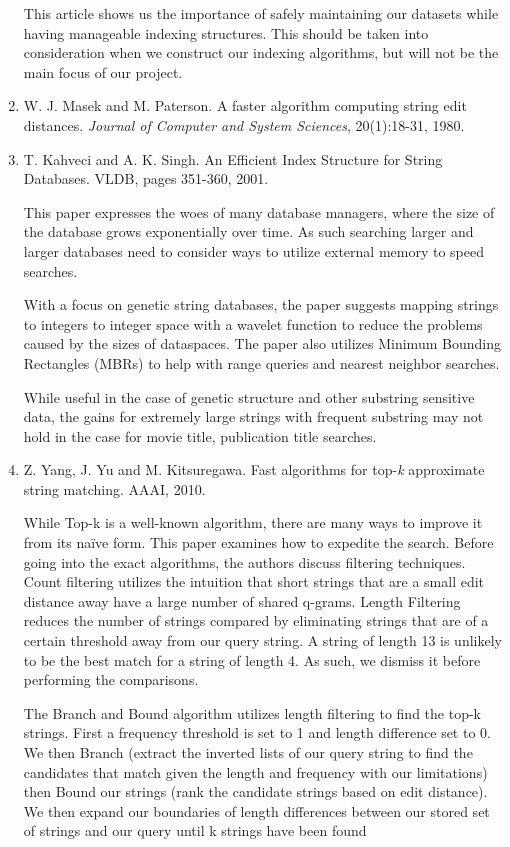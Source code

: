 \documentclass[pdftex,12pt,letter]{article}
\begin{document}
\begin{enumerate}
	This article shows us the importance of safely maintaining our datasets while having manageable indexing structures. This should be taken into consideration when we construct our indexing algorithms, but will not be the main focus of our project. 


\item W. J. Masek and M. Paterson. A faster algorithm computing string edit distances. \textit{Journal of Computer and System Sciences}, 20(1):18-31, 1980.
\item T. Kahveci and A. K. Singh. An Efficient Index Structure for String Databases. VLDB, pages 351-360, 2001.

	This paper expresses the woes of many database managers, where the size of the database grows exponentially over time. As such searching larger and larger databases need to consider ways to utilize external memory to speed searches. 

	With a focus on genetic string databases, the paper suggests mapping strings to integers to integer space with a wavelet function to reduce the problems caused by the sizes of dataspaces. The paper also utilizes Minimum Bounding Rectangles (MBRs) to help with range queries and nearest neighbor searches. 

	While useful in the case of genetic structure and other substring sensitive data, the gains for extremely large strings with frequent substring may not hold in the case for movie title, publication title searches. 


\item Z. Yang, J. Yu and M. Kitsuregawa. Fast algorithms for top-\textit{k} approximate string matching. AAAI, 2010.

	While Top-k is a well-known algorithm, there are many ways to improve it from its naïve form. This paper examines how to expedite the search. Before going into the exact algorithms, the authors discuss filtering techniques. Count filtering utilizes the intuition that short strings that are a small edit distance away have a large number of shared q-grams. Length Filtering reduces the number of strings compared by eliminating strings that are of a certain threshold away from our query string. A string of length 13 is unlikely to be the best match for a string of length 4. As such, we dismiss it before performing the comparisons. 

	The Branch and Bound algorithm utilizes length filtering to find the top-k strings. First a frequency threshold is set to 1 and length difference set to 0. We then Branch (extract the inverted lists of our query string to find the candidates that match given the length and frequency with our limitations) then Bound our strings (rank the candidate strings based on edit distance). We then expand our boundaries of length differences between our stored set of strings and our query until k strings have been found


\end{enumerate}
\end{document}
